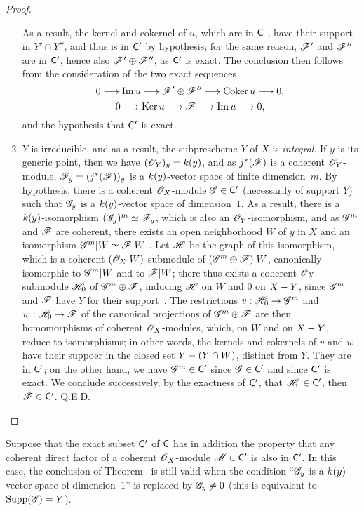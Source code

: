 \begin{proof}
\begin{enumerate}[label=(\alph*)]
    As a result, the kernel and cokernel of $u$, which are in $\mathsf{C}$ , have their support in $Y'\cap Y''$, and thus is in $\mathsf{C}'$ by hypothesis; for the same reason, $\mathscr{F}'$ and $\mathscr{F}''$ are in $\mathsf{C}'$, hence also $\mathscr{F}'\oplus\mathscr{F}''$, as $\mathsf{C}'$ is exact.
    The conclusion then follows from the consideration of the two exact sequences
    \[
      0\to\Im u\to\sh{F}'\oplus\sh{F}''\to\Coker u\to 0,
    \]
    \[
      0\to\Ker u\to\sh{F}\to\Im u\to 0,
    \]
    and the hypothesis that $\mathsf{C}'$ is exact.
  \item $Y$ is irreducible, and as a result, the subprescheme $Y$ of $X$ is \emph{integral}.
    If $y$ is its generic point, then we have $(\mathscr{O}_Y)_y=k(y)$, and as $j^*(\mathscr{F})$ is a coherent $\mathscr{O}_Y$-module, $\mathscr{F}_y=(j^*(\mathscr{F}))_y$ is a $k(y)$-vector space of finite dimension~$m$.
    By hypothesis, there is a coherent $\mathscr{O}_X$-module $\mathscr{G}\in\mathsf{C}'$ (necessarily of support $Y$) such that $\mathscr{G}_y$ is a $k(y)$-vector space of dimension~$1$.
    As a result, there is a $k(y)$-isomorphism $(\mathscr{G}_y)^m\simeq\mathscr{F}_y$, which is also an $\mathscr{O}_Y$-isomorphism, and as $\mathscr{G}^m$ and $\mathscr{F}$ are coherent, there exists an open neighborhood $W$ of $y$ in $X$ and an isomorphism $\mathscr{G}^m|W\simeq\mathscr{F}|W$ .
    Let $\mathscr{H}$ be the graph of this isomorphism, which is a coherent $(\mathscr{O}_X|W)$-submodule of $(\mathscr{G}^m\oplus\mathscr{F})|W$, canonically isomorphic to $\mathscr{G}^m|W$ and to $\mathscr{F}|W$; there thus exists a coherent $\mathscr{O}_X$-submodule $\mathscr{H}_0$ of $\mathscr{G}^m\oplus\mathscr{F}$, inducing $\mathscr{H}$ on $W$ and $0$ on $X- Y$, since $\mathscr{G}^m$ and $\mathscr{F}$ have $Y$ for their support~.
    The restrictions $v:\sh{H}_0\to\sh{G}^m$ and $w:\sh{H}_0\to\sh{F}$ of the canonical projections of $\mathscr{G}^m\oplus\mathscr{F}$ are then homomorphisms of coherent $\mathscr{O}_X$-modules, which, on $W$ and on $X- Y$, reduce to isomorphisms; in other words, the kernels and cokernels of $v$ and $w$ have their suppoer in the closed set $Y-(Y\cap W)$, distinct from $Y$.
    They are in $\mathsf{C}'$; on the other hand, we have $\mathscr{G}^m\in\mathsf{C}'$ since $\mathscr{G}\in\mathsf{C}'$ and since $\mathsf{C}'$ is exact.
    We conclude successively, by the exactness of $\mathsf{C}'$, that $\mathscr{H}_0\in\mathsf{C}'$, then $\mathscr{F}\in\mathsf{C}'$.
Q.E.D.
\end{enumerate}
\end{proof}

\begin{cor}[3.1.3]
\label{3.3.1.3}
Suppose that the exact subset $\mathsf{C}'$ of $\mathsf{C}$ has in addition the property that any coherent direct factor of a coherent $\mathscr{O}_X$-module $\mathscr{M}\in\mathsf{C}'$ is also in $\mathsf{C}'$.
In this case, the conclusion of Theorem~ is still valid when the condition ``$\mathscr{G}_y$ is a $k(y)$-vector space of dimension~$1$'' is replaced by $\mathscr{G}_y\neq 0$ (this is equivalent to ${\mathop{\mathrm{Supp}}\nolimits}(\mathscr{G})=Y$).
\end{cor}

